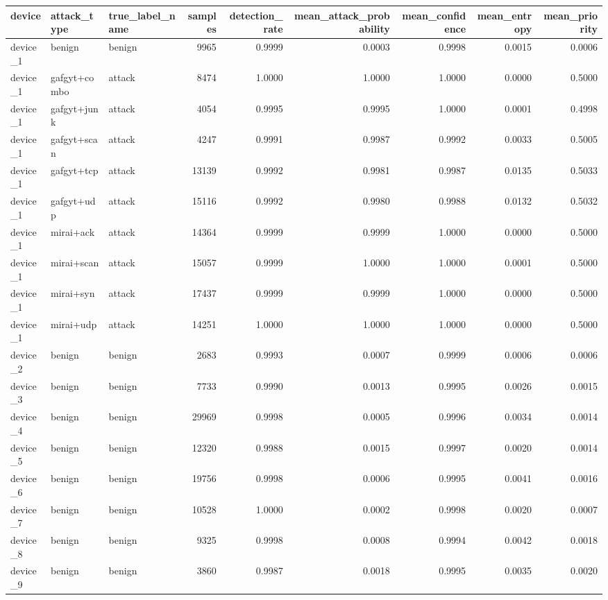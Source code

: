 \begin{tabular}{lllrrrrrr}
\toprule
device & attack_type & true_label_name & samples & detection_rate & mean_attack_probability & mean_confidence & mean_entropy & mean_priority \\
\midrule
device_1 & benign & benign & 9965 & 0.9999 & 0.0003 & 0.9998 & 0.0015 & 0.0006 \\
device_1 & gafgyt+combo & attack & 8474 & 1.0000 & 1.0000 & 1.0000 & 0.0000 & 0.5000 \\
device_1 & gafgyt+junk & attack & 4054 & 0.9995 & 0.9995 & 1.0000 & 0.0001 & 0.4998 \\
device_1 & gafgyt+scan & attack & 4247 & 0.9991 & 0.9987 & 0.9992 & 0.0033 & 0.5005 \\
device_1 & gafgyt+tcp & attack & 13139 & 0.9992 & 0.9981 & 0.9987 & 0.0135 & 0.5033 \\
device_1 & gafgyt+udp & attack & 15116 & 0.9992 & 0.9980 & 0.9988 & 0.0132 & 0.5032 \\
device_1 & mirai+ack & attack & 14364 & 0.9999 & 0.9999 & 1.0000 & 0.0000 & 0.5000 \\
device_1 & mirai+scan & attack & 15057 & 0.9999 & 1.0000 & 1.0000 & 0.0001 & 0.5000 \\
device_1 & mirai+syn & attack & 17437 & 0.9999 & 0.9999 & 1.0000 & 0.0000 & 0.5000 \\
device_1 & mirai+udp & attack & 14251 & 1.0000 & 1.0000 & 1.0000 & 0.0000 & 0.5000 \\
device_2 & benign & benign & 2683 & 0.9993 & 0.0007 & 0.9999 & 0.0006 & 0.0006 \\
device_3 & benign & benign & 7733 & 0.9990 & 0.0013 & 0.9995 & 0.0026 & 0.0015 \\
device_4 & benign & benign & 29969 & 0.9998 & 0.0005 & 0.9996 & 0.0034 & 0.0014 \\
device_5 & benign & benign & 12320 & 0.9988 & 0.0015 & 0.9997 & 0.0020 & 0.0014 \\
device_6 & benign & benign & 19756 & 0.9998 & 0.0006 & 0.9995 & 0.0041 & 0.0016 \\
device_7 & benign & benign & 10528 & 1.0000 & 0.0002 & 0.9998 & 0.0020 & 0.0007 \\
device_8 & benign & benign & 9325 & 0.9998 & 0.0008 & 0.9994 & 0.0042 & 0.0018 \\
device_9 & benign & benign & 3860 & 0.9987 & 0.0018 & 0.9995 & 0.0035 & 0.0020 \\
\bottomrule
\end{tabular}
